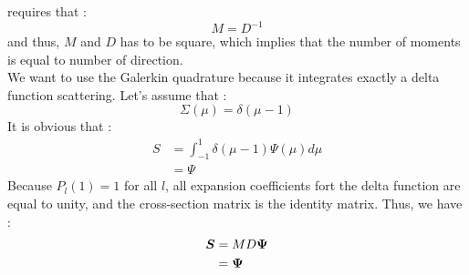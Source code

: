 requires that :
\begin{equation}
M = D^{-1}
\end{equation}
and thus, $M$ and $D$ has to be square, which implies that the number of
moments is equal to number of direction.\\
We want to use the Galerkin quadrature because it integrates exactly a delta
function scattering. Let's assume that :
\begin{equation}
\Sigma(\mu) = \delta(\mu-1)
\end{equation}
It is obvious that :
\begin{equation}
\begin{split}
S &= \int_{-1}^1 \delta(\mu-1) \Psi(\mu) d\mu\\
&= \Psi
\end{split}
\end{equation}
Because $P_l(1)=1$ for all $l$, all expansion coefficients fort the delta
function are equal to unity, and the cross-section matrix is the identity
matrix. Thus, we have :
\begin{equation}
\begin{split}
\boldsymbol{S} &= MD\boldsymbol{\Psi}\\
&= \boldsymbol{\Psi}\\
\end{split}
\end{equation}

